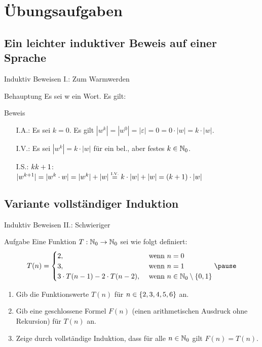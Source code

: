 \section{Übungsaufgaben}
\subsection{Ein leichter induktiver Beweis auf einer Sprache}
\begin{frame}{Induktiv Beweisen I.: Zum Warmwerden}
	\begin{exampleblock}{Behauptung}
		Es sei w ein Wort. Es gilt:\\
	\end{exampleblock}
\pause
	\begin{block}{Beweis}
		\begin{itemize}
			\item[I.A.:] Es sei $k=0$. Es gilt $|w^k|=|w^0|=|\varepsilon|=0=0 \cdot |w| = k \cdot |w|$.
			\item[I.V.:] Es sei $|w^k|=k \cdot |w|$ für ein bel., aber festes $k\in \mathbb{N}_0$.
			\item[I.S.:] $k \Stephan{\curvearrowright} \notStephan{\leadsto} k+1$:\\
						 $|w^{k+1}|=|w^k \cdot w|=|w^k|+|w| \eqtext{I.V.} k \cdot |w| + |w| = (k+1) \cdot |w|$
		\end{itemize}
	\end{block}
\end{frame}
\subsection{Variante vollständiger Induktion} %
\begin{frame}{Induktiv Beweisen II.: Schwieriger}
	\begin{exampleblock}{Aufgabe}
		Eine Funktion $T:\mathbb{N}_0 \rightarrow \mathbb{N}_0$ sei wie folgt definiert:
		\begin{equation}
		T(n) = 
			\begin{cases}
			 2, &\text{ wenn } n=0 \\
			 3, &\text{ wenn } n=1 \\
			 3 \cdot T(n-1) - 2 \cdot T(n-2), &\text{ wenn }n \in \nN_0 \setminus \set{0,1}
		\end{cases} \pause
		\end{equation}
		\begin{enumerate}
			\item Gib die Funktionswerte $T(n)$ für $n \in \{ 2,3,4,5,6 \}$ an.
			\item Gib eine geschlossene Formel $F(n)$ (einen arithmetischen Ausdruck ohne Rekursion) für $T(n)$ an.
			\item Zeige durch vollständige Induktion, dass für alle $n \in \mathbb{N}_0$ gilt $F(n) = T(n)$.
		\end{enumerate}
	\end{exampleblock}
\end{frame}
